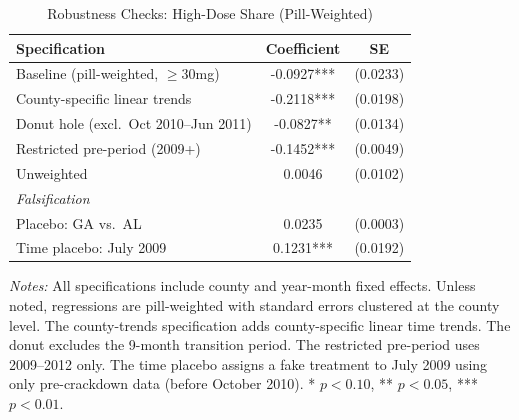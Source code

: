 \begin{table}[H]
\centering
\caption{Robustness Checks: High-Dose Share (Pill-Weighted)}
\label{tab:robustness}
\begin{threeparttable}
\begin{tabular}{lcc}
\toprule
Specification & Coefficient & SE \\
\midrule
Baseline (pill-weighted, $\geq$30mg) & -0.0927*** & (0.0233) \\
County-specific linear trends & -0.2118*** & (0.0198) \\
Donut hole (excl.\ Oct 2010--Jun 2011) & -0.0827** & (0.0134) \\
Restricted pre-period (2009+) & -0.1452*** & (0.0049) \\
Unweighted & 0.0046 & (0.0102) \\
\midrule
\textit{Falsification} & & \\
Placebo: GA vs.\ AL & 0.0235 & (0.0003) \\
Time placebo: July 2009 & 0.1231*** & (0.0192) \\
\bottomrule
\end{tabular}
\begin{tablenotes}[flushleft]
\small
\item \textit{Notes:} All specifications include county and year-month fixed effects. Unless noted, regressions are pill-weighted with standard errors clustered at the county level. The county-trends specification adds county-specific linear time trends. The donut excludes the 9-month transition period. The restricted pre-period uses 2009--2012 only. The time placebo assigns a fake treatment to July 2009 using only pre-crackdown data (before October 2010). * $p<0.10$, ** $p<0.05$, *** $p<0.01$.
\end{tablenotes}
\end{threeparttable}
\end{table}
